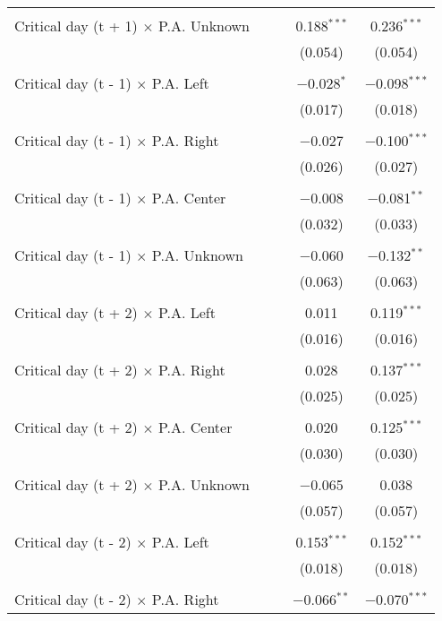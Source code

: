 \documentclass[
]{article}
\begin{document}
\begin{table}[!htbp]
{\begin{tabular}{@{\extracolsep{5pt}}lcccc}
  & & & & \\ 
 Critical day (t + 1) $\times$ P.A. Unknown &  &  & 0.188$^{***}$ & 0.236$^{***}$ \\ 
  &  &  & (0.054) & (0.054) \\ 
  & & & & \\ 
 Critical day (t - 1) $\times$ P.A. Left &  &  & $-$0.028$^{*}$ & $-$0.098$^{***}$ \\ 
  &  &  & (0.017) & (0.018) \\ 
  & & & & \\ 
 Critical day (t - 1) $\times$ P.A. Right &  &  & $-$0.027 & $-$0.100$^{***}$ \\ 
  &  &  & (0.026) & (0.027) \\ 
  & & & & \\ 
 Critical day (t - 1) $\times$ P.A. Center &  &  & $-$0.008 & $-$0.081$^{**}$ \\ 
  &  &  & (0.032) & (0.033) \\ 
  & & & & \\ 
 Critical day (t - 1) $\times$ P.A. Unknown &  &  & $-$0.060 & $-$0.132$^{**}$ \\ 
  &  &  & (0.063) & (0.063) \\ 
  & & & & \\ 
 Critical day (t + 2) $\times$ P.A. Left &  &  & 0.011 & 0.119$^{***}$ \\ 
  &  &  & (0.016) & (0.016) \\ 
  & & & & \\ 
 Critical day (t + 2) $\times$ P.A. Right &  &  & 0.028 & 0.137$^{***}$ \\ 
  &  &  & (0.025) & (0.025) \\ 
  & & & & \\ 
 Critical day (t + 2) $\times$ P.A. Center &  &  & 0.020 & 0.125$^{***}$ \\ 
  &  &  & (0.030) & (0.030) \\ 
  & & & & \\ 
 Critical day (t + 2) $\times$ P.A. Unknown &  &  & $-$0.065 & 0.038 \\ 
  &  &  & (0.057) & (0.057) \\ 
  & & & & \\ 
 Critical day (t - 2) $\times$ P.A. Left &  &  & 0.153$^{***}$ & 0.152$^{***}$ \\ 
  &  &  & (0.018) & (0.018) \\ 
  & & & & \\ 
 Critical day (t - 2) $\times$ P.A. Right &  &  & $-$0.066$^{**}$ & $-$0.070$^{***}$ \\ 

\end{tabular}}
\end{table}
\end{document}
